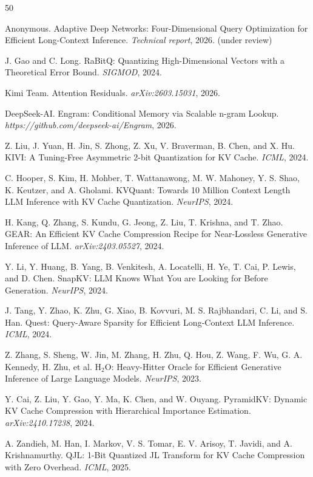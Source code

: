 \documentclass[twocolumn]{article}
\begin{document}
\begin{thebibliography}{50}

Anonymous. Adaptive Deep Networks: Four-Dimensional Query Optimization for Efficient Long-Context Inference. \emph{Technical report}, 2026. (under review)

J. Gao and C. Long. RaBitQ: Quantizing High-Dimensional Vectors with a Theoretical Error Bound. \emph{SIGMOD}, 2024.

Kimi Team. Attention Residuals. \emph{arXiv:2603.15031}, 2026.

DeepSeek-AI. Engram: Conditional Memory via Scalable n-gram Lookup. \emph{https://github.com/deepseek-ai/Engram}, 2026.

Z. Liu, J. Yuan, H. Jin, S. Zhong, Z. Xu, V. Braverman, B. Chen, and X. Hu. KIVI: A Tuning-Free Asymmetric 2-bit Quantization for KV Cache. \emph{ICML}, 2024.

C. Hooper, S. Kim, H. Mohber, T. Wattanawong, M. W. Mahoney, Y. S. Shao, K. Keutzer, and A. Gholami. KVQuant: Towards 10 Million Context Length LLM Inference with KV Cache Quantization. \emph{NeurIPS}, 2024.

H. Kang, Q. Zhang, S. Kundu, G. Jeong, Z. Liu, T. Krishna, and T. Zhao. GEAR: An Efficient KV Cache Compression Recipe for Near-Lossless Generative Inference of LLM. \emph{arXiv:2403.05527}, 2024.

Y. Li, Y. Huang, B. Yang, B. Venkitesh, A. Locatelli, H. Ye, T. Cai, P. Lewis, and D. Chen. SnapKV: LLM Knows What You are Looking for Before Generation. \emph{NeurIPS}, 2024.

J. Tang, Y. Zhao, K. Zhu, G. Xiao, B. Kovvuri, M. S. Rajbhandari, C. Li, and S. Han. Quest: Query-Aware Sparsity for Efficient Long-Context LLM Inference. \emph{ICML}, 2024.

Z. Zhang, S. Sheng, W. Jin, M. Zhang, H. Zhu, Q. Hou, Z. Wang, F. Wu, G. A. Kennedy, H. Zhu, et al. H$_2$O: Heavy-Hitter Oracle for Efficient Generative Inference of Large Language Models. \emph{NeurIPS}, 2023.

Y. Cai, Z. Liu, Y. Gao, Y. Ma, K. Chen, and W. Ouyang. PyramidKV: Dynamic KV Cache Compression with Hierarchical Importance Estimation. \emph{arXiv:2410.17238}, 2024.

A. Zandieh, M. Han, I. Markov, V. S. Tomar, E. V. Arisoy, T. Javidi, and A. Krishnamurthy. QJL: 1-Bit Quantized JL Transform for KV Cache Compression with Zero Overhead. \emph{ICML}, 2025.


\end{thebibliography}
\end{document}
